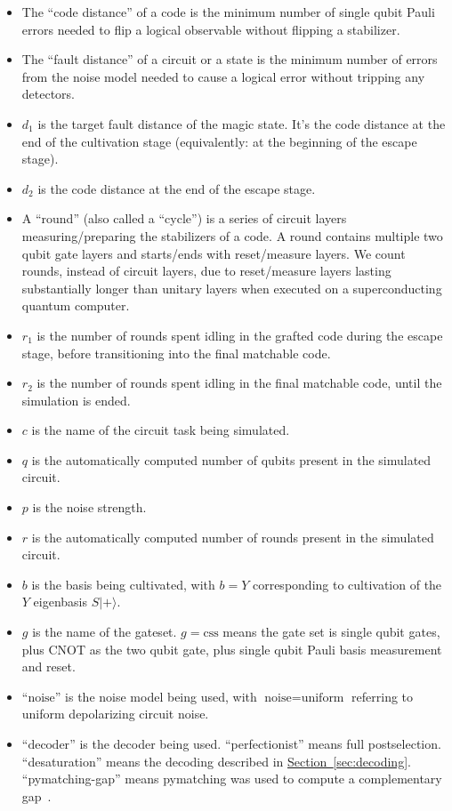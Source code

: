\documentclass[onecolumn,unpublished,a4paper]{quantumarticle}
\theoremstyle{definition}
\renewcommand{\sec}[1]{\hyperref[sec:#1]{Section~\ref*{sec:#1}}}
\begin{document}
\begin{itemize}
    \item The ``code distance'' of a code is the minimum number of single qubit Pauli errors needed to flip a logical observable without flipping a stabilizer.
    \item The ``fault distance'' of a circuit or a state is the minimum number of errors from the noise model needed to cause a logical error without tripping any detectors.
    \item 
$d_1$ is the target fault distance of the magic state.
It's the code distance at the end of the cultivation stage (equivalently: at the beginning of the escape stage).
    \item 
$d_2$ is the code distance at the end of the escape stage.
    \item A ``round'' (also called a ``cycle'') is a series of circuit layers measuring/preparing the stabilizers of a code. A round contains multiple two qubit gate layers and starts/ends with reset/measure layers. We count rounds, instead of circuit layers, due to reset/measure layers lasting substantially longer than unitary layers when executed on a superconducting quantum computer.
    \item 
$r_1$ is the number of rounds spent idling in the grafted code during the escape stage, before transitioning into the final matchable code.
    \item 
$r_2$ is the number of rounds spent idling in the final matchable code, until the simulation is ended. 
    \item 
$c$ is the name of the circuit task being simulated.
    \item 
$q$ is the automatically computed number of qubits present in the simulated circuit.
    \item 
$p$ is the noise strength.
    \item 
$r$ is the automatically computed number of rounds present in the simulated circuit.
    \item 
$b$ is the basis being cultivated, with $b=Y$ corresponding to cultivation of the $Y$ eigenbasis $S|+\rangle$.
    \item 
$g$ is the name of the gateset. $g=\text{css}$ means the gate set is single qubit gates, plus CNOT as the two qubit gate, plus single qubit Pauli basis measurement and reset.
    \item 
``$\text{noise}$'' is the noise model being used, with $\text{noise}=\text{uniform}$ referring to uniform depolarizing circuit noise.
    \item 
``$\text{decoder}$'' is the decoder being used.
``perfectionist'' means full postselection.
``desaturation'' means the decoding described in \sec{decoding}.
``pymatching-gap'' means pymatching was used to compute a complementary gap~\cite{higgott2023sparseblossom,gidney2024yoked}.
\end{itemize}
\end{document}
